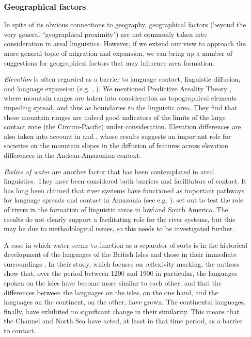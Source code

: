 \documentclass[output=paper]{langscibook}
\begin{document}
\subsubsection{Geographical factors} \label{subsec:geofactors}

In spite of its obvious connections to geography, geographical factors (beyond the very general ``geographical proximity") are not commonly taken into consideration in areal linguistics. However, if we extend our view to approach the more general topic of migration and expansion, we can bring up a number of suggestions for geographical factors that may influence area formation.

\textit{Elevation} is often regarded as a barrier to language contact, linguistic diffusion, and language expansion (e.g. \citealt{Nichols1992Linguistic}, \citeyear{nichols1997modeling}). We mentioned Predictive Areality Theory \parencite{Bickeletal2006Oceania}, where mountain ranges are taken into consideration as topographical elements impeding spread, and thus as boundaries to the linguistic area. They find that these mountain ranges are indeed good indicators of the limits of the large contact zone (the Circum-Pacific) under consideration. Elevation differences are also taken into account in \textcite{gijn2014andean} and \textcite{gijnetalInpressHighland}, whose results suggests an important role for societies on the mountain slopes in the diffusion of features across elevation differences in the Andean-Amazonian context.

\textit{Bodies of water} are another factor that has been contemplated in areal linguistics. They have been considered both barriers and facilitators of contact. It has long been claimed that river systems have functioned as important pathways for language spreads and contact in Amazonia (see e.g. \citealt{hornborg2005ethnogenesis,eriksen2011nature}). \textcite{gijnetal2017linguistic}
set out to test the role of rivers in the formation of linguistic areas in lowland South America. The results do not clearly support a facilitating role for the river systems, but this may be due to methodological issues, so this needs to be investigated further.

A case in which water seems to function as a separator of sorts is in the historical development of the languages of the British Isles and those in their immediate surroundings \parencite{dedioetalforthcevidence}. In their study, which focuses on reflexivity marking, the authors show that, over the period between 1200 and 1900 in particular, the languages spoken on the isles have become more similar to each other, and that the differences between the languages on the isles, on the one hand, and the languages on the continent, on the other, have grown. The continental languages, finally, have exhibited no significant change in their similarity. This means that the Channel and North Sea have acted, at least in that time period, as a barrier to contact. 
\end{document}
